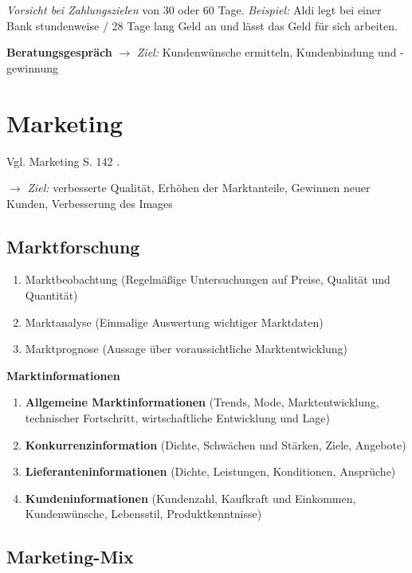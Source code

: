 \emph{Vorsicht bei Zahlungszielen} von 30 oder 60 Tage. \emph{Beispiel:}
Aldi legt bei einer Bank stundenweise / 28 Tage lang Geld an und lässt
das Geld für sich arbeiten.

\textbf{Beratungsgespräch} $\to$ \emph{Ziel:} Kundenwünsche ermitteln,
Kundenbindung und -gewinnung

\newpage

\section{Marketing}\label{marketing}

Vgl. Marketing S. 142 \textcite{heiser:2017:betriebsfuhrung}.

$\to$ \emph{Ziel:} verbesserte Qualität, Erhöhen der Marktanteile,
Gewinnen neuer Kunden, Verbesserung des Images

\subsection{Marktforschung}\label{marktforschung}

\begin{enumerate}
\item
  Marktbeobachtung (Regelmäßige Untersuchungen auf Preise, Qualität und
  Quantität)
\item
  Marktanalyse (Einmalige Auswertung wichtiger Marktdaten)
\item
  Marktprognose (Aussage über voraussichtliche Marktentwicklung)
\end{enumerate}

\textbf{Marktinformationen}

\begin{enumerate}
\item
  \textbf{Allgemeine Marktinformationen} (Trends, Mode,
  Marktentwicklung, technischer Fortschritt, wirtschaftliche Entwicklung
  und Lage)
\item
  \textbf{Konkurrenzinformation} (Dichte, Schwächen und Stärken, Ziele,
  Angebote)
\item
  \textbf{Lieferanteninformationen} (Dichte, Leistungen, Konditionen,
  Ansprüche)
\item
  \textbf{Kundeninformationen} (Kundenzahl, Kaufkraft und Einkommen,
  Kundenwünsche, Lebensstil, Produktkenntnisse)
\end{enumerate}

\subsection{Marketing-Mix}\label{marketing-mix}

